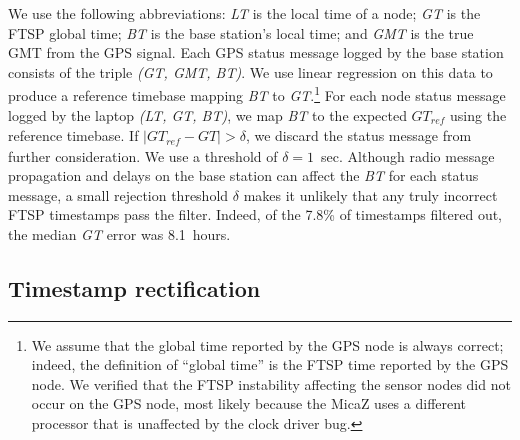 We use the following abbreviations: {\em LT} is the local time of a node;
{\em GT} is the FTSP global time; {\em BT} is the base station's local time;
and {\em GMT} is the true GMT from the GPS signal.  Each GPS status message
logged by the base station consists of the triple {\em (GT, GMT, BT)}.  We
use linear regression on this data to produce a reference timebase mapping
{\em BT} to {\em GT}.\footnote{We assume that the global time reported by the
GPS node is always correct; indeed, the definition of ``global time'' is the
FTSP time reported by the GPS node. We verified that the FTSP instability
affecting the sensor nodes did not occur on the GPS node, most likely because
the MicaZ uses a different processor that is unaffected by the clock driver
bug.} For each node status message logged by the laptop {\em (LT, GT, BT)},
we map {\em BT} to the expected $\mathit{GT}_{\mathit{ref}}$ using the
reference timebase. If $ \mid \mathit{GT}_{\mathit{ref}} - \mathit{GT} \mid >
\delta$, we discard the status message from further consideration.  We use a
threshold of $\delta = 1$~sec.  Although radio message propagation and delays
on the base station can affect the {\em BT} for each status message, a small
rejection threshold $\delta$ makes it unlikely that any truly incorrect FTSP
timestamps pass the filter. Indeed, of the 7.8\% of timestamps filtered out,
the median {\em GT} error was 8.1~hours.



\subsection{Timestamp rectification}
\label{evaluation-section-timerectification}

